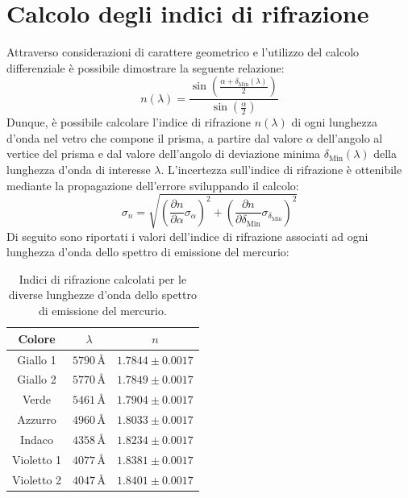 \documentclass[a4paper,12pt]{article}
\begin{document}
\section{Calcolo degli indici di rifrazione}

Attraverso considerazioni di carattere geometrico e l’utilizzo del calcolo differenziale è possibile dimostrare la seguente relazione:
\[
n(\lambda) = \frac{\sin\left(\frac{\alpha + \delta_{\text{Min}}(\lambda)}{2}\right)}{\sin\left(\frac{\alpha}{2}\right)}
\]
Dunque, è possibile calcolare l’indice di rifrazione \( n(\lambda) \) di ogni lunghezza d’onda nel vetro che compone il prisma, a partire dal valore \( \alpha \) dell’angolo al vertice del prisma e dal valore dell’angolo di deviazione minima \( \delta_{\text{Min}}(\lambda) \) della lunghezza d’onda di interesse \( \lambda \).
L’incertezza sull’indice di rifrazione è ottenibile mediante la propagazione dell’errore sviluppando il calcolo:
\[
\sigma_n = \sqrt{\left( \frac{\partial n}{\partial \alpha} \sigma_\alpha \right)^2 + \left( \frac{\partial n}{\partial \delta_{\text{Min}}} \sigma_{\delta_{\text{Min}}} \right)^2 }
\]
Di seguito sono riportati i valori dell’indice di rifrazione associati ad ogni lunghezza d’onda dello spettro di emissione del mercurio:

\begin{table}[H]
\centering
\begin{tabular}{ccc}
\hline
\textbf{Colore} & \textbf{\( \lambda \)} & \textbf{\( n \)} \\ \hline
Giallo 1 & \( 5790 \, \text{\AA} \) & \( 1.7844 \pm 0.0017 \) \\ 
Giallo 2 & \( 5770 \, \text{\AA} \) & \( 1.7849 \pm 0.0017 \) \\
Verde & \( 5461 \, \text{\AA} \) & \( 1.7904 \pm 0.0017 \) \\ 
Azzurro  & \( 4960 \, \text{\AA} \) & \( 1.8033 \pm 0.0017 \) \\ 
Indaco & \( 4358 \, \text{\AA} \) & \( 1.8234 \pm 0.0017 \) \\ 
Violetto 1 & \( 4077 \, \text{\AA} \) & \( 1.8381 \pm 0.0017 \) \\ 
Violetto 2 & \( 4047 \, \text{\AA} \) & \( 1.8401 \pm 0.0017 \) \\ \hline
\end{tabular}
\caption{Indici di rifrazione calcolati per le diverse lunghezze d’onda dello spettro di emissione del mercurio.}
\label{tab:indici_rifrazione}
\end{table}
\end{document}
